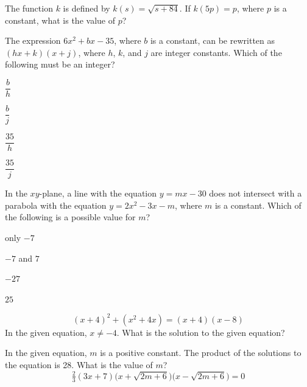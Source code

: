 \vfill
\clearpage
\noindent\begin{minipage}{\linewidth}
\par\smallskip
The function $k$ is defined by $k(s)=\sqrt{s+84}$. If $k(5p)=p$, where $p$ is a constant, what is the value of $p$?
\end{minipage}
\vfill
\noindent\begin{minipage}{\linewidth}
\par\smallskip
The expression $6x^2+bx-35$, where $b$ is a constant, can be rewritten as $(hx+k)(x+j)$, where $h$, $k$, and $j$ are integer constants. Which of the following must be an integer?
\begin{satchoices}
  \item[A)] $\dfrac{b}{h}$
  \item[B)] $\dfrac{b}{j}$
  \item[C)] $\dfrac{35}{h}$
  \item[D)] $\dfrac{35}{j}$
\end{satchoices}
\end{minipage}
\vfill
\noindent\begin{minipage}{\linewidth}
\par\smallskip
In the $xy$-plane, a line with the equation $y=mx-30$ does not intersect with a parabola with the equation $y=2x^2-3x-m$, where $m$ is a constant. Which of the following is a possible value for $m$?
\begin{satchoices}
  \item[A)] only $-7$
  \item[B)] $-7$ and $7$
  \item[C)] $-27$
  \item[D)] $25$
\end{satchoices}
\end{minipage}
\vfill
\clearpage
\noindent\begin{minipage}{\linewidth}
\par\smallskip
$$(x+4)^2+(x^2+4x)=(x+4)(x-8)$$ In the given equation, $x\neq-4$. What is the solution to the given equation?
\end{minipage}
\vfill
\noindent\begin{minipage}{\linewidth}
\par\smallskip
In the given equation, $m$ is a positive constant. The product of the solutions to the equation is 28. What is the value of $m$? $$\tfrac{2}{3}(3x+7)\bigl(x+\sqrt{2m+6}\bigr)\bigl(x-\sqrt{2m+6}\bigr)=0$$
\end{minipage}
